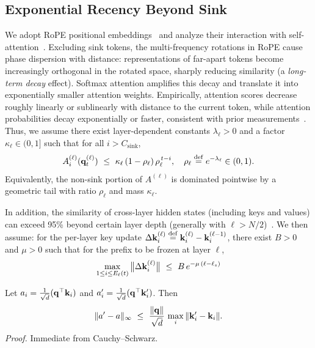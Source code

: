 \subsection{Exponential Recency Beyond Sink}
\label{sec:exp-decay}
We adopt RoPE positional embeddings~\cite{su2024roformer} and analyze their interaction with self-attention~\cite{vaswani2017attention}. Excluding sink tokens, the multi-frequency rotations in RoPE cause phase dispersion with distance: representations of far-apart tokens become increasingly orthogonal in the rotated space, sharply reducing similarity (a \emph{long-term decay} effect). Softmax attention amplifies this decay and translate it into exponentially smaller attention weights. Empirically, attention scores decrease roughly linearly or sublinearly with distance to the current token, while attention probabilities decay exponentially or faster, consistent with prior measurements~\cite{zhang2023h2o,xiao2023streamingllm}. Thus, we assume there exist layer-dependent constants $\lambda_\ell>0$ and a factor
$\kappa_\ell\in(0,1]$ such that for all $i>C_{\text{sink}}$,
\begin{equation}
\label{eq:exp-decay}
A^{(\ell)}_i(\mathbf{q}^{(\ell)}_t)
\ \le\
\kappa_\ell\,(1-\rho_\ell)\,\rho_\ell^{\,t-i},
\quad \rho_\ell \stackrel{\mathrm{def}}{=} e^{-\lambda_\ell}\in(0,1).
\end{equation}
Equivalently, the non-sink portion of $A^{(\ell)}$ is dominated pointwise by a geometric tail with ratio $\rho_\ell$ and mass $\kappa_\ell$. 

In addition, the similarity of cross-layer hidden states (including keys and values) can exceed 95\% beyond certain layer depth (generally with $\ell{>}N/2$)~\cite{liu2405minicache}. We then assume: for the per-layer key update $\Delta\mathbf{k}^{(\ell)}_i
\stackrel{\mathrm{def}}{=}\mathbf{k}^{(\ell)}_i-\mathbf{k}^{(\ell-1)}_i$, there exist
$B>0$ and $\mu>0$ such that for the prefix to be frozen at layer $\ell$,
\begin{equation}
\label{eq:cross-layer-update}
\max_{1\le i\le E_\ell(t)} \big\|\Delta\mathbf{k}^{(\ell)}_i\big\|
\ \le\
B\,e^{-\mu\,(\ell-\ell_s)}
\end{equation}


\begin{lemma}
\label{lem:logitDelta}
Let $a_i=\tfrac{1}{\sqrt d}(\mathbf{q}^\top \mathbf{k}_i)$ and
$a'_i=\tfrac{1}{\sqrt d}(\mathbf{q}^\top \mathbf{k}'_i)$. Then
\[
\|a'-a\|_\infty
\ \le\ \frac{\|\mathbf{q}\|}{\sqrt d}\,\max_i\|\mathbf{k}'_i-\mathbf{k}_i\|.
\]
\emph{Proof.} Immediate from Cauchy--Schwarz. \qedhere
\end{lemma}

